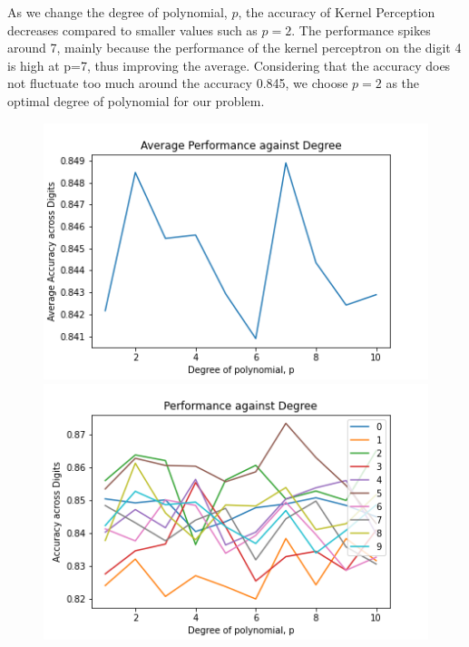 \documentclass[twoside,11pt]{homework}
\begin{document}
	As we change the degree of polynomial, $p$, the accuracy of Kernel Perception decreases compared to smaller values
	such as $p=2$. The performance spikes around 7,  mainly because the performance of the kernel perceptron on the digit 4 is
	high at p=7, thus improving the average. Considering that the accuracy does not fluctuate too much around the accuracy 0.845,
	we choose $p=2$ as the optimal degree of polynomial for our problem.
	\begin{figure}[H]
		\includegraphics[scale=0.5]{q6/img/degree_ker.png}
		\includegraphics[scale=0.5]{q6/img/degree_ker_all.png}
	\end{figure}
\end{document}
